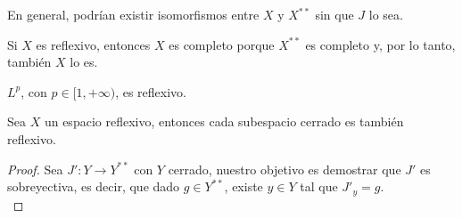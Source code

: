 \begin{observacion}
    En general, podrían existir isomorfismos entre $X$ y $X^{**}$ sin que $J$ lo sea.
\end{observacion}

\begin{observacion}
    Si $X$ es reflexivo, entonces $X$ es completo porque $X^{**}$ es completo y, por lo tanto, también $X$ lo es.
\end{observacion}

\begin{ejemplo}
    $L^p$, con $p\in [1, +\infty)$, es reflexivo.
\end{ejemplo}

\begin{prop}
    Sea $X$ un espacio reflexivo, entonces cada subespacio cerrado es también reflexivo.

\begin{proof}
    Sea $J':Y\to Y^{**}$ con $Y$ cerrado, nuestro objetivo es demostrar que $J'$ es sobreyectiva, es decir, que dado $g \in Y^{**}$, existe $y \in Y$ tal que $J'_y = g$. \\
    

\end{proof}
\end{prop}
